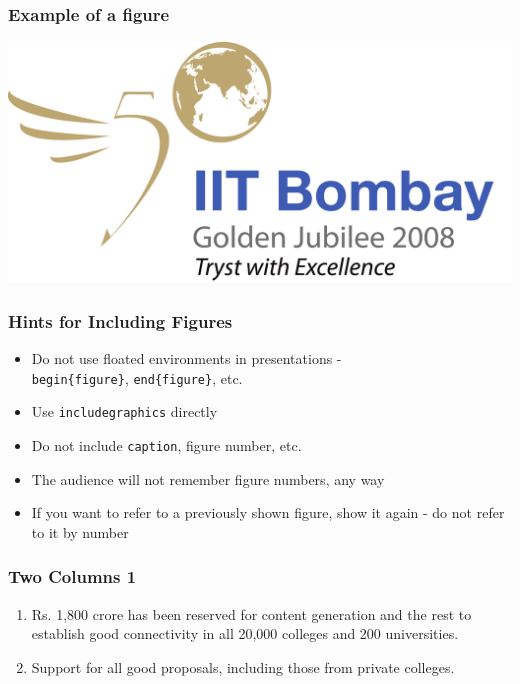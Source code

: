 \documentclass{beamer}
\begin{document}
\begin{frame}
\frametitle{Example of a figure}
\begin{center}
\includegraphics[width=\linewidth]{iitb}
\end{center}
\end{frame}

\begin{frame}
\frametitle{Hints for Including Figures}
\begin{itemize}
\item<+-> Do not use floated environments in
  presentations 
  - \\ {\tt begin\{figure\}}, {\tt end\{figure\}}, 
  etc. 
\item<+-> Use {\tt includegraphics} directly
\item<+-> Do not include {\tt caption}, figure
  number, etc.
\item<+-> The audience will not remember figure
  numbers, any way
\item<+-> If you want to refer to a previously
  shown figure, show it again - do not refer to it
  by number
\end{itemize}
\end{frame}

\begin{frame}
\frametitle{Two Columns 1}
\begin{minipage}[c]{0.45\textwidth} %
\begin{enumerate}
\item<+-|alert@+> Rs. 1,800 crore has been reserved for
  content generation and the rest to establish good
  connectivity in all 20,000 colleges and 200
  universities.
\item<+-|alert@+> Support for all good proposals,
  including those from private colleges.
\end{enumerate}
\end{minipage}
\end{frame}
\end{document}
